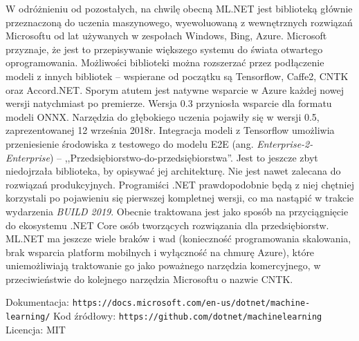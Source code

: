 \documentclass[12pt,a4paper,twoside,titlepage,openright]{book}
\begin{document}
W odróżnieniu od pozostałych, na chwilę obecną ML.NET jest biblioteką głównie przeznaczoną do uczenia maszynowego, wyewoluowaną z wewnętrznych rozwiązań Microsoftu od lat używanych w zespołach Windows, Bing, Azure. Microsoft przyznaje, że jest to przepisywanie większego systemu do świata otwartego oprogramowania. \cite{siteMLNet} Możliwości biblioteki można rozszerzać przez podłączenie modeli z innych bibliotek -- wspierane od początku są Tensorflow, Caffe2, CNTK oraz Accord.NET. Sporym atutem jest natywne wsparcie w Azure każdej nowej wersji natychmiast po premierze. Wersja 0.3 przyniosła wsparcie dla formatu modeli ONNX. Narzędzia do głębokiego uczenia pojawiły się w wersji 0.5, zaprezentowanej 12 września 2018r. Integracja modeli z Tensorflow umożliwia przeniesienie środowiska z testowego do modelu E2E (ang. \textit{Enterprise-2-Enterprise}) -- ,,Przedsiębiorstwo-do-przedsiębiorstwa''. Jest to jeszcze zbyt niedojrzała biblioteka, by opisywać jej architekturę. Nie jest nawet zalecana do rozwiązań produkcyjnych. Programiści .NET prawdopodobnie będą z niej chętniej korzystali po pojawieniu się pierwszej kompletnej wersji, co ma nastąpić w trakcie wydarzenia \textit{BUILD 2019}. Obecnie traktowana jest jako sposób na przyciągnięcie do ekosystemu .NET Core osób tworzących rozwiązania dla przedsiębiorstw. ML.NET ma jeszcze wiele braków i wad (konieczność programowania skalowania, brak wsparcia platform mobilnych i wyłączność na chmurę Azure), które uniemożliwiają traktowanie go jako poważnego narzędzia komercyjnego, w przeciwieństwie do kolejnego narzędzia Microsoftu o nazwie CNTK.

\noindent
\newline
Dokumentacja: \texttt{https://docs.microsoft.com/en-us/dotnet/machine-learning/}
\newline
Kod źródłowy: \texttt{https://github.com/dotnet/machinelearning}
\newline
Licencja: MIT
\end{document}
